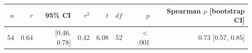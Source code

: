 \begin{tabular}{rrrrrrrr}
\toprule
$n$ & $r$ & 95\% CI & $r^2$ & $t$ & $df$ & $p$ & Spearman $\rho$ [bootstrap CI] \\
\midrule
54 & 0.64 & [0.46, 0.78] & 0.42 & 6.08 & 52 & $<$.001 & 0.73 [0.57, 0.85] \\
\bottomrule
\end{tabular}
